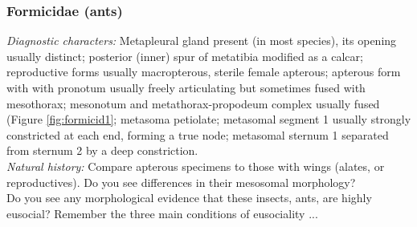 \documentclass[letterpaper, 11pt]{article}
\begin{document}
\subsubsection{Formicidae (ants)}
\noindent{}\textit{Diagnostic characters:} Metapleural gland present (in most species), its opening usually distinct; posterior (inner) spur of metatibia modified as a calcar; reproductive forms usually macropterous, sterile female apterous; apterous form with with pronotum usually freely articulating but sometimes fused with mesothorax; mesonotum and metathorax-propodeum complex usually fused (Figure \ref{fig:formicid1}; metasoma petiolate; metasomal segment 1 usually strongly constricted at each end, forming a true node; metasomal sternum 1 separated from sternum 2 by a deep constriction.\\

\noindent{}\textit{Natural history:} Compare apterous specimens to those with wings (alates, or reproductives). Do you see differences in their mesosomal morphology? \\

\noindent{}Do you see any morphological evidence that these insects, ants, are highly eusocial? Remember the three main conditions of eusociality ...\\
\end{document}

